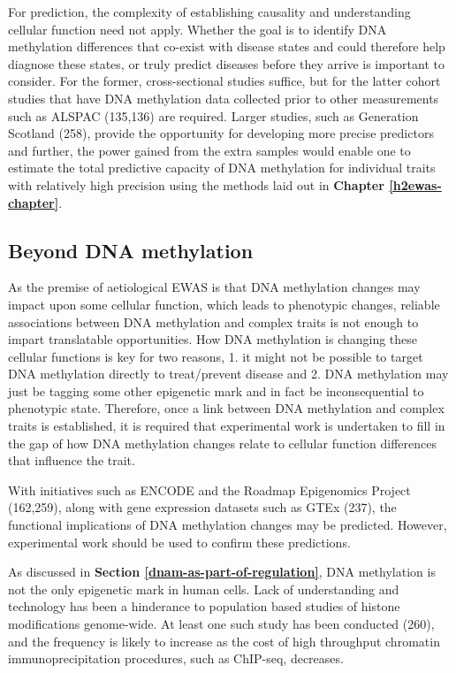 \documentclass[11pt,oneside]{bristolthesis}
\begin{document}
For prediction, the complexity of establishing causality and understanding cellular function need not apply. Whether the goal is to identify DNA methylation differences that co-exist with disease states and could therefore help diagnose these states, or truly predict diseases before they arrive is important to consider. For the former, cross-sectional studies suffice, but for the latter cohort studies that have DNA methylation data collected prior to other measurements such as ALSPAC (135,136) are required. Larger studies, such as Generation Scotland (258), provide the opportunity for developing more precise predictors and further, the power gained from the extra samples would enable one to estimate the total predictive capacity of DNA methylation for individual traits with relatively high precision using the methods laid out in \textbf{Chapter \ref{h2ewas-chapter}}.

\hypertarget{beyond-dnam}{%
\subsection{Beyond DNA methylation}\label{beyond-dnam}}

As the premise of aetiological EWAS is that DNA methylation changes may impact upon some cellular function, which leads to phenotypic changes, reliable associations between DNA methylation and complex traits is not enough to impart translatable opportunities. How DNA methylation is changing these cellular functions is key for two reasons, 1. it might not be possible to target DNA methylation directly to treat/prevent disease and 2. DNA methylation may just be tagging some other epigenetic mark and in fact be inconsequential to phenotypic state. Therefore, once a link between DNA methylation and complex traits is established, it is required that experimental work is undertaken to fill in the gap of how DNA methylation changes relate to cellular function differences that influence the trait.

With initiatives such as ENCODE and the Roadmap Epigenomics Project (162,259), along with gene expression datasets such as GTEx (237), the functional implications of DNA methylation changes may be predicted. However, experimental work should be used to confirm these predictions.

As discussed in \textbf{Section \ref{dnam-as-part-of-regulation}}, DNA methylation is not the only epigenetic mark in human cells. Lack of understanding and technology has been a hinderance to population based studies of histone modifications genome-wide. At least one such study has been conducted (260), and the frequency is likely to increase as the cost of high throughput chromatin immunoprecipitation procedures, such as ChIP-seq, decreases.
\end{document}

